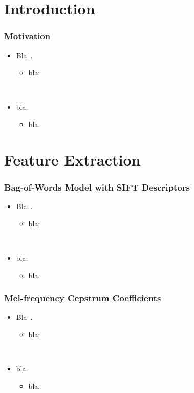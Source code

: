 \documentclass{beamer}
\title{\trtitle}
\author{\trauthor}
\begin{document}
\frame{\titlepage}


\section{Introduction}
\begin{frame}
  \frametitle{Motivation}

  \begin{itemize}
    \item Bla~\cite{rabiner_fundamentals_1993}.
      \begin{itemize}
        \item bla; 
      \end{itemize}
      ~

    \item bla.
      \begin{itemize}
        \item bla.
      \end{itemize}
  \end{itemize}
\end{frame}

\section{Feature Extraction}
\begin{frame}
  \frametitle{Bag-of-Words Model with SIFT Descriptors}

  \begin{itemize}
    \item Bla~\cite{rabiner_fundamentals_1993}.
      \begin{itemize}
        \item bla; 
      \end{itemize}
      ~

    \item bla.
      \begin{itemize}
        \item bla.
      \end{itemize}
  \end{itemize}
\end{frame}

\begin{frame}
  \frametitle{Mel-frequency Cepstrum Coefficients}

  \begin{itemize}
    \item Bla~\cite{rabiner_fundamentals_1993}.
      \begin{itemize}
        \item bla; 
      \end{itemize}
      ~

    \item bla.
      \begin{itemize}
        \item bla.
      \end{itemize}
  \end{itemize}
\end{frame}
\end{document}
